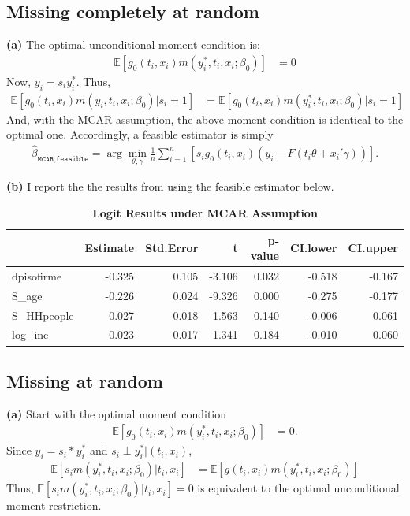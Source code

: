 \documentclass[12pt]{article}
\newcommand{\E}{\mathbb{E}}
\newcommand{\mtx}[1]{\ensuremath{\bm{\mathit{#1}}}}
\begin{document}
\subsection{Missing completely at random}
\textbf{(a)} The optimal unconditional moment condition is:
\begin{align*}
\E[\mtx{g}_0(t_i,\mtx{x}_i)m(y_i^*, t_i, \mtx{x}_i; \mtx{\beta}_0)] &=0
\end{align*}
Now, $y_i = s_iy_i^*$. Thus,
\begin{align*}
\E[\mtx{g}_0(t_i,\mtx{x}_i)m(y_i, t_i, \mtx{x}_i; \mtx{\beta}_0)|s_i = 1] &=\E[\mtx{g}_0(t_i,\mtx{x}_i)m(y_i^*, t_i, \mtx{x}_i; \mtx{\beta}_0)|s_i = 1] 
\end{align*}
And, with the MCAR assumption, the above moment condition is identical to the optimal one. Accordingly, a feasible estimator is simply
\begin{align*}
\hat{\mtx{\beta}}_{\texttt{MCAR,feasible}}= \arg \min_{\theta, \gamma} \frac{1}{n} \sum_{i=1}^n [s_i \mtx{g}_0(t_i,\mtx{x}_i)(y_i-F(t_i \theta+\mtx{x}_i'\mtx{\gamma}))].
\end{align*}

\textbf{(b)}
I report the the results from using the feasible estimator below.

\begin{table}[!htpb]
\centering
\caption{\textbf{Logit Results under MCAR Assumption}}
\begin{tabular}{lrrrrrr}
  \hline
 & Estimate & Std.Error & t & p-value & CI.lower & CI.upper \\ 
  \hline
dpisofirme & -0.325 & 0.105 & -3.106 & 0.032 & -0.518 & -0.167 \\ 
  S\_age & -0.226 & 0.024 & -9.326 & 0.000 & -0.275 & -0.177 \\ 
  S\_HHpeople & 0.027 & 0.018 & 1.563 & 0.140 & -0.006 & 0.061 \\ 
  log\_inc & 0.023 & 0.017 & 1.341 & 0.184 & -0.010 & 0.060 \\ 
   \hline
\end{tabular}
\end{table}


\subsection{Missing at random}
\textbf{(a)} Start with the optimal moment condition
\begin{align*}
\E[\mtx{g}_0(t_i,\mtx{x}_i)m(y_i^*, t_i, \mtx{x}_i; \mtx{\beta}_0)] &=0.
\end{align*}
Since $y_i=s_i*y_i^*$ and $s_i \perp y_i^*|(t_i,x_i)$,
\begin{align*}
\E[s_i m(y_i^*, t_i, \mtx{x}_i; \mtx{\beta}_0)|t_i,x_i]&=\E[\mtx{g}(t_i,\mtx{x}_i)m(y_i^*, t_i, \mtx{x}_i; \mtx{\beta}_0)]
\end{align*}
Thus, $\E[s_i m(y_i^*,t_i,x_i; \beta_0)|t_i,x_i]=0$ is equivalent to the optimal unconditional moment restriction.\\
\end{document}
